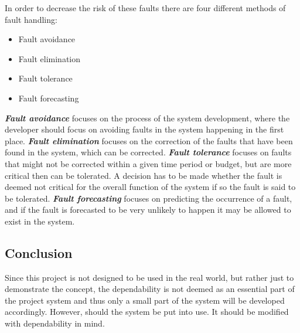 In order to decrease the risk of these faults there are four different methods of fault handling:
\begin{itemize}
\item Fault avoidance
\item Fault elimination
\item Fault tolerance
\item Fault forecasting
\end{itemize}
\textit{\textbf{Fault avoidance}} focuses on the process of the system development, where the developer should focus on avoiding faults in the system happening in the first place.
\textit{\textbf{Fault elimination}} focuses on the correction of the faults that have been found in the system, which can be corrected. 
\textit{\textbf{Fault tolerance}} focuses on faults that might not be corrected within a given time period or budget, but are more critical then can be tolerated.
A decision has to be made whether the fault is deemed not critical for the overall function of the system if so the fault is said to be tolerated.
\textit{\textbf{Fault forecasting}} focuses on predicting the occurrence of a fault, and if the fault is forecasted to be very unlikely to happen it may be allowed to exist in the system. 

\subsection{Conclusion}
Since this project is not designed to be used in the real world, but rather just to demonstrate the concept, the dependability is not deemed as an essential part of the project system and thus only a small part of the system will be developed accordingly.
However, should the system be put into use.
It should be modified with dependability in mind. 
